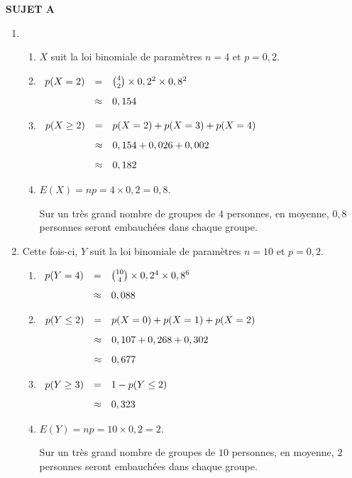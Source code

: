 \documentclass[10pt,french,openright,twoside]{book}
\begin{document}
\textbf{SUJET A}\medskip

\begin{enumerate}
	\item
	\begin{enumerate}
		\item $X$ suit la loi binomiale de paramètres $n = 4$ et $p = 0,2$.
		\item $\begin{array}[t]{rcl}
					p(X = 2) & = & \binom 4 2 \times 0,2^2 \times 0,8^2 \\[8pt]
							& \approx & 0,154
				\end{array}$
		\item $\begin{array}[t]{rcl}
					p(X \geq 2) & = & p(X = 2) + p(X = 3) + p(X = 4) \\[8pt]
								& \approx & 0,154 + 0,026 + 0,002 \\[8pt]
								& \approx & 0,182
				\end{array}$
		\item $E(X) = np = 4 \times 0,2 = 0,8$.\par
		Sur un très grand nombre de groupes de $4$ personnes, en moyenne, $0,8$ personnes seront embauchées dans chaque groupe.
	\end{enumerate}

	\item Cette fois-ci, $Y$ suit la loi binomiale de paramètres $n = 10$ et $p = 0,2$.
	\begin{enumerate}
		\item $\begin{array}[t]{rcl}
					p(Y = 4) & = & \binom{10}{4} \times 0,2^4 \times 0,8^6 \\[8pt]
							& \approx & 0,088
				\end{array}$
		\item $\begin{array}[t]{rcl}
					p(Y \leq 2) & = & p(X = 0) + p(X = 1) + p(X = 2) \\[8pt]
								& \approx & 0,107 + 0,268 + 0,302 \\[8pt]
								& \approx & 0,677
				\end{array}$
		\item $\begin{array}[t]{rcl}
					p(Y \geq 3) & = & 1 - p(Y \leq 2) \\[8pt]
								& \approx & 0,323
				\end{array}$
		\item $E(Y) = np = 10 \times 0,2 = 2$.\par
		Sur un très grand nombre de groupes de $10$ personnes, en moyenne, $2$ personnes seront embauchées dans chaque groupe.
	\end{enumerate}
\end{enumerate}
\end{document}
